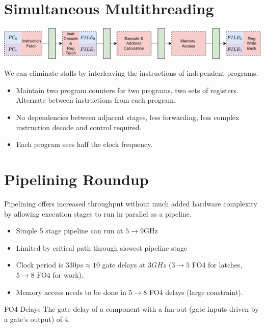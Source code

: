 \section{Simultaneous Multithreading}
\begin{center}
    \includegraphics[width=.9\textwidth]{pipelining/images/simultaneous_multithreading.drawio.png}
\end{center}
We can eliminate stalls by interleaving the instructions of independent programs. 
\begin{itemize}
    \item Maintain two program counters for two programs, two sets of registers. Alternate between instructions from each program.
    \item No dependencies between adjacent stages, less forwarding, less complex instruction decode and control required.
    \item Each program sees half the clock frequency.
\end{itemize}

\section{Pipelining Roundup}
Pipelining offers increased throughput without much added hardware complexity by allowing execution stages to run in parallel as a pipeline.
\begin{itemize}
    \item Simple 5 stage pipeline can run at $5 \to 9$GHz
    \item Limited by critical path through slowest pipeline stage
    \item Clock period is $330ps \approx 10$ gate delays at $3GHz$ ($3 \to 5$ FO4 for latches, $5\to8$ FO4 for work).
    \item Memory access needs to be done in $5\to8$ FO4 delays (large constraint).
\end{itemize}

\begin{sidenotebox}{FO4 Delays}
    The gate delay of a component with a fan-out (gate inputs driven by a gate's output) of 4.
\end{sidenotebox}